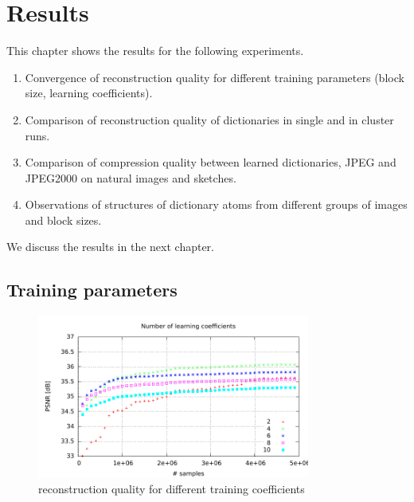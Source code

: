 \chapter{Results}
This chapter shows the results for the following experiments.
\begin{enumerate}
 \item Convergence of reconstruction quality for different training parameters
(block size, learning coefficients).
 \item Comparison of reconstruction quality of dictionaries
in single and in cluster runs. 
 \item Comparison of compression quality between learned dictionaries, JPEG and
JPEG2000  on natural images and sketches.
 \item Observations of structures of dictionary atoms from different
groups of images and block sizes.
\end{enumerate}

We discuss the results in the next chapter.

\newpage

\section{Training parameters}
\begin{figure}[h]
\centering
\includegraphics[width = 0.8\textwidth]{../tests/results/coeffsConverg.pdf}
\caption{reconstruction quality for different training coefficients}
\label{fig:dict size}
\end{figure}

